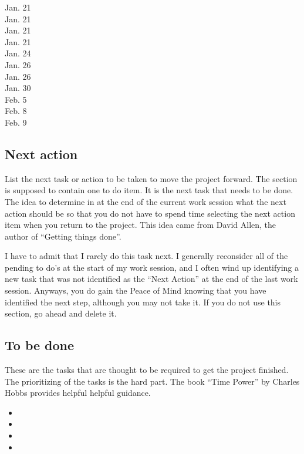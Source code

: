 \documentclass[10pt,letterpaper]{article}
\newcommand{\bi}{\begin{itemize}}
\newcommand{\ei}{\end{itemize}}
\begin{document}
\begin{description}
\item [Jan. 21]
\item [Jan. 21]
\item [Jan. 21] 
\item [Jan. 21] 
\item [Jan. 24] 
\item [Jan. 26]
\item [Jan. 26]
\item [Jan. 30] 
\item [Feb. 5] 
\item [Feb. 8]
\item [Feb. 9]
\end{description}

\subsection{Next action}
\label{sub:next}

List the next task or action to be taken to move the project forward.
The section is supposed to contain one to do item.
It is the next task that needs to be done.
The idea to determine in at the end of the current work session what the next action should be so that you do not have to spend time selecting the next action item when you return to the project.
This idea came from David Allen, the author of ``Getting things done''.

I have to admit that I rarely do this task next. 
I generally reconsider all of the pending to do's at the start of my work session, and I often wind up identifying a new task that was not identified as the ``Next Action'' at the end of the last work session.
Anyways, you do gain the Peace of Mind knowing that you have identified the next step, although you may not take it.
If you do not use this section, go ahead and delete it.


\subsection{To be done}
\label{sub:to-do}

These are the tasks that are thought to be required to get the project finished.
The prioritizing of the tasks is the hard part.
The book ``Time Power'' by Charles Hobbs provides helpful helpful guidance.

\bi
\item 
\item 
\item 
\item 
\ei
\end{document}
